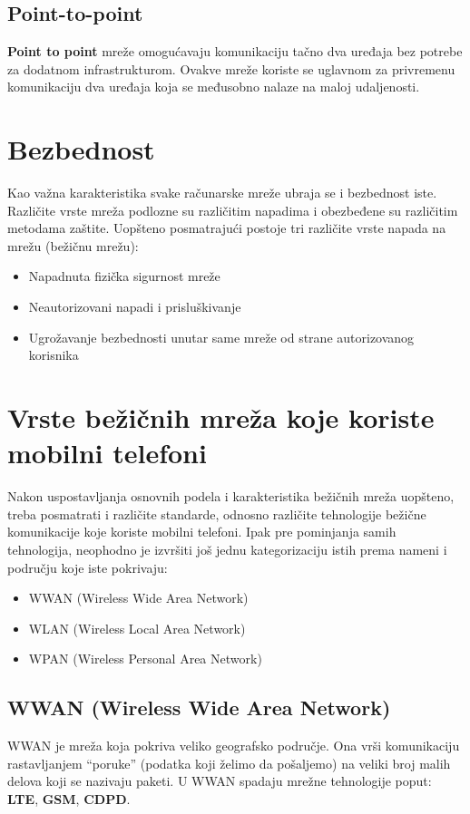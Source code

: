 \documentclass[a4paper]{article}
\begin{document}
    \subsection{Point-to-point}
\textbf{Point to point} mreže omogućavaju komunikaciju tačno dva uređaja bez potrebe za dodatnom infrastrukturom. Ovakve mreže koriste se uglavnom za privremenu komunikaciju dva uređaja koja se međusobno nalaze na maloj udaljenosti.

\section{Bezbednost}	
\label{sec:Bezbednost}

Kao važna karakteristika svake računarske mreže ubraja se i bezbednost iste. Različite vrste mreža podlozne su različitim napadima i obezbeđene su različitim metodama zaštite.
Uopšteno posmatrajući postoje tri različite vrste napada na mrežu (bežičnu mrežu):

\begin{itemize}
    \item Napadnuta fizička sigurnost mreže
    \item Neautorizovani napadi i prisluškivanje
    \item Ugrožavanje bezbednosti unutar same mreže od strane autorizovanog korisnika
\end{itemize}


\section{Vrste bežičnih mreža koje koriste mobilni telefoni}
\label{vrste_mreza_na_telefonu}

Nakon uspostavljanja osnovnih podela i karakteristika bežičnih mreža uopšteno, treba posmatrati i različite standarde, odnosno različite tehnologije bežične komunikacije koje koriste mobilni telefoni. Ipak pre pominjanja samih tehnologija, neophodno je izvršiti još jednu kategorizaciju istih prema nameni i području koje iste pokrivaju:

\begin{itemize}
    \item WWAN (Wireless Wide Area Network)
    \item WLAN (Wireless Local Area Network)
    \item WPAN (Wireless Personal Area Network)
\end{itemize}
    \subsection{WWAN (Wireless Wide Area Network)}
WWAN je mreža koja pokriva veliko geografsko područje. Ona vrši komunikaciju rastavljanjem “poruke” (podatka koji želimo da pošaljemo) na veliki broj malih delova koji se nazivaju paketi. U WWAN spadaju mrežne tehnologije poput: \textbf{LTE}, \textbf{GSM}, \textbf{CDPD}. 
\end{document}
